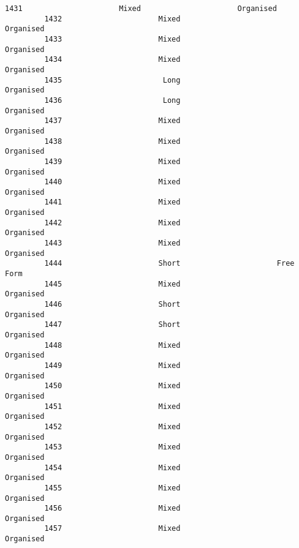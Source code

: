 \documentclass[11pt]{article}
\begin{document}
\begin{Verbatim}[commandchars=\\\{\}]
         1431                      Mixed                      Organised   
         1432                      Mixed                      Organised   
         1433                      Mixed                      Organised   
         1434                      Mixed                      Organised   
         1435                       Long                      Organised   
         1436                       Long                      Organised   
         1437                      Mixed                      Organised   
         1438                      Mixed                      Organised   
         1439                      Mixed                      Organised   
         1440                      Mixed                      Organised   
         1441                      Mixed                      Organised   
         1442                      Mixed                      Organised   
         1443                      Mixed                      Organised   
         1444                      Short                      Free Form   
         1445                      Mixed                      Organised   
         1446                      Short                      Organised   
         1447                      Short                      Organised   
         1448                      Mixed                      Organised   
         1449                      Mixed                      Organised   
         1450                      Mixed                      Organised   
         1451                      Mixed                      Organised   
         1452                      Mixed                      Organised   
         1453                      Mixed                      Organised   
         1454                      Mixed                      Organised   
         1455                      Mixed                      Organised   
         1456                      Mixed                      Organised   
         1457                      Mixed                      Organised   
         

\end{Verbatim}
\end{document}
